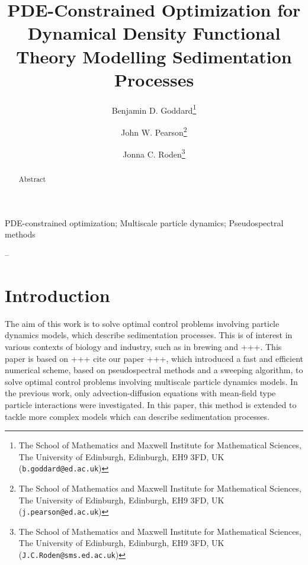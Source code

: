 \documentclass[final]{siamltex}
\title{PDE-Constrained Optimization for Dynamical Density Functional Theory Modelling Sedimentation Processes}
\author{Benjamin D. Goddard\thanks{The School of Mathematics and Maxwell Institute for Mathematical Sciences, The University of Edinburgh, Edinburgh, EH9 3FD, UK ({\tt b.goddard@ed.ac.uk})} 
	\and John W. Pearson\thanks{The School of Mathematics and Maxwell Institute for Mathematical Sciences, The University of Edinburgh, Edinburgh, EH9 3FD, UK ({\tt j.pearson@ed.ac.uk})} 
	\and Jonna C. Roden\thanks{The School of Mathematics and Maxwell Institute for Mathematical Sciences, The University of Edinburgh, Edinburgh, EH9 3FD, UK ({\tt J.C.Roden@sms.ed.ac.uk})}}
\begin{document}
	\maketitle
	
	\begin{abstract}
		Abstract
	\end{abstract}
	
	\begin{keywords}PDE-constrained optimization; Multiscale particle dynamics; Pseudospectral methods\end{keywords}
	
	\begin{AMS}--\end{AMS}
	
	
	\pagestyle{myheadings}
	\thispagestyle{plain}
	
	
\section{Introduction}\label{sec:Intro}
The aim of this work is to solve optimal control problems involving particle dynamics models, which describe sedimentation processes. This is of interest in various contexts of biology and industry, such as in brewing and +++. This paper is based on +++ cite our paper +++, which introduced a fast and efficient numerical scheme, based on pseudospectral methods and a sweeping algorithm, to solve optimal control problems involving multiscale particle dynamics models. In the previous work, only advection-diffusion equations with mean-field type particle interactions were investigated. In this paper, this method is extended to tackle more complex models which can describe sedimentation processes.
\end{document}
